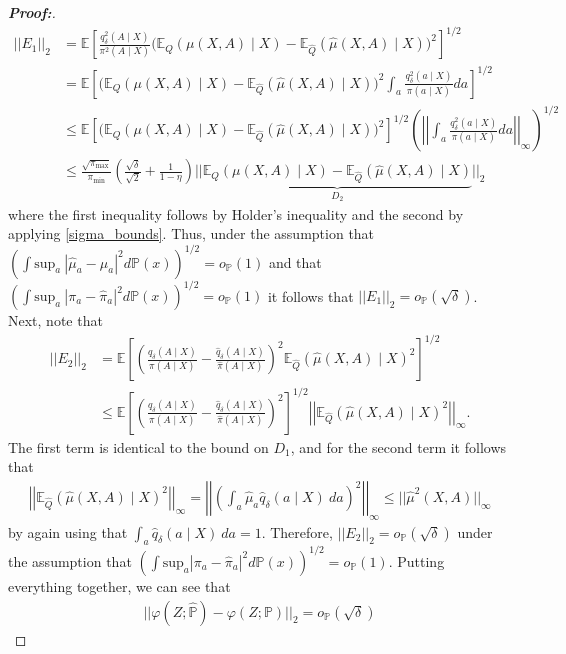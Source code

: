 \documentclass[11pt,twoside]{article}
\theoremstyle{definition}
\theoremstyle{remark}
\let\hat\widehat
\begin{document}
\begin{proof}[\textbf{Proof:}]
\begin{align*}
    ||E_1||_2 &= \mathbb{E}\left[\frac{q^2_\delta(A \mid X)}{\pi^2(A \mid X)}\Big(\mathbb{E}_Q(\mu(X, A) \mid X) - \mathbb{E}_{\hat{Q}}(\hat{\mu}(X, A) \mid X) \Big)^2\right]^{1/2} \\
    &= \mathbb{E}\left[\Big(\mathbb{E}_Q(\mu(X, A) \mid X) - \mathbb{E}_{\hat{Q}}(\hat{\mu}(X, A) \mid X) \Big)^2 \int_a \frac{q^2_\delta(a \mid X)}{\pi(a \mid X)} da\right]^{1/2} \\
    &\leq  \mathbb{E}\left[\Big(\mathbb{E}_Q(\mu(X, A) \mid X) - \mathbb{E}_{\hat{Q}}(\hat{\mu}(X, A) \mid X) \Big)^2\right]^{1/2} \left( \left| \left| \int_a \frac{q^2_\delta(a \mid X)}{\pi(a \mid X)} da \right| \right|_\infty \right)^{1/2} \\
    &\leq \frac{\sqrt{\pi_{\max}}}{\pi_{\min}}\left(\frac{\sqrt{\delta}}{\sqrt{2}} + \frac{1}{1 - \eta}  \right)  \Big| \Big|\underbrace{\mathbb{E}_Q(\mu(X, A) \mid X) - \mathbb{E}_{\hat{Q}}(\hat{\mu}(X, A) \mid X)}_{D_2} \Big| \Big|_2
\end{align*}
where the first inequality follows by Holder's inequality and the second by applying \cref{sigma_bounds}. Thus, under the assumption that $(\int \text{sup}_a \ |\hat{\mu}_a - \mu_a|^2 d\mathbb{P}(x))^{1/2} = o_\mathbb{P}(1)$ and that $( \int \text{sup}_a \ |\pi_a - \widehat\pi_a|^2 d \mathbb{P}(x))^{1/2} = o_\mathbb{P}(1)$ it follows that  $||E_1||_2 = o_\mathbb{P}(\sqrt{\delta})$. Next, note that
\begin{align*}
    ||E_2||_2 &= \mathbb{E}\left[\left(\frac{q_\delta(A \mid X)}{\pi(A \mid X)} - \frac{\hat{q}_\delta(A \mid X)}{\hat{\pi}(A \mid X)}\right)^2\mathbb{E}_{\hat{Q}}(\hat{\mu}(X, A) \mid X)^2 \right]^{1/2} \\
    &\leq \mathbb{E}\left[\left(\frac{q_\delta(A \mid X)}{\pi(A \mid X)} - \frac{\hat{q}_\delta(A \mid X)}{\hat{\pi}(A \mid X)}\right)^2 \right]^{1/2} \left| \left| \mathbb{E}_{\hat{Q}}(\hat{\mu}(X, A) \mid X)^2 \right| \right|_\infty.
\end{align*}
The first term is identical to the bound on $D_1$, and for the second term it follows that
\begin{align*}
    \left| \left| \mathbb{E}_{\hat{Q}}(\hat{\mu}(X, A) \mid X)^2 \right| \right|_\infty = \left| \left| \left(\int_a \hat{\mu}_a \hat{q}_\delta(a \mid X) \ da\right)^2 \right| \right|_\infty \leq ||\hat{\mu}^2(X, A)||_\infty 
\end{align*}
by again using that $\int_a \hat{q}_\delta(a \mid X) \ da = 1$. Therefore, $||E_2||_2 = o_\mathbb{P}(\sqrt{\delta})$ under the assumption that $( \int \text{sup}_a  |\pi_a - \hat{\pi}_a|^2 d\mathbb{P}(x))^{1/2} = o_\mathbb{P}(1)$. Putting everything together, we can see that
\begin{align*}
    ||\varphi(Z; \hat{\mathbb{P}}) - \varphi(Z; \mathbb{P})||_2 = o_\mathbb{P}(\sqrt{\delta})
\end{align*}
\end{proof}
\end{document}
